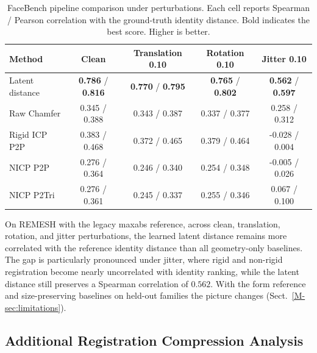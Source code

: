 \begin{table}[h]
\centering
\small
\caption{
FaceBench pipeline comparison under perturbations. Each cell reports Spearman /
Pearson correlation with the ground-truth identity distance. Bold indicates the
best score. Higher is better.
}
\label{tab:facebench_pipeline_perturbed_app}
\begin{tabular}{lcccc}
\toprule
Method & Clean & Translation 0.10 & Rotation 0.10 & Jitter 0.10 \\
\midrule
Latent distance
& \textbf{0.786} / \textbf{0.816}
& \textbf{0.770} / \textbf{0.795}
& \textbf{0.765} / \textbf{0.802}
& \textbf{0.562} / \textbf{0.597} \\

Raw Chamfer
& 0.345 / 0.388
& 0.343 / 0.387
& 0.337 / 0.377
& 0.258 / 0.312 \\

Rigid ICP P2P
& 0.383 / 0.468
& 0.372 / 0.465
& 0.379 / 0.464
& -0.028 / 0.004 \\

NICP P2P
& 0.276 / 0.364
& 0.246 / 0.340
& 0.254 / 0.348
& -0.005 / 0.026 \\

NICP P2Tri
& 0.276 / 0.361
& 0.245 / 0.337
& 0.255 / 0.346
& 0.067 / 0.100 \\
\bottomrule
\end{tabular}
\end{table}

On REMESH with the legacy maxabs reference, across clean, translation, rotation,
and jitter perturbations, the learned latent distance remains more correlated
with the reference identity distance than all geometry-only baselines. The gap
is particularly pronounced under jitter, where rigid and non-rigid registration
become nearly uncorrelated with identity ranking, while the latent distance still
preserves a Spearman correlation of $0.562$. With the form reference and
size-preserving baselines on held-out families the picture changes
(Sect.~\ref{M-sec:limitations}).

\subsection{Additional Registration Compression Analysis}
\label{app:compression_analysis}

